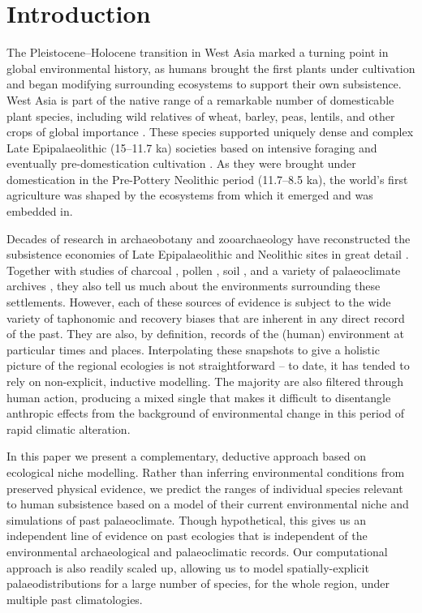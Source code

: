 \documentclass[
  authoryear,
  preprint]{elsarticle}
\begin{document}
\section{Introduction}\label{introduction}

The Pleistocene--Holocene transition in West Asia marked a turning point
in global environmental history, as humans brought the first plants
under cultivation and began modifying surrounding ecosystems to support
their own subsistence. West Asia is part of the native range of a
remarkable number of domesticable plant species, including wild
relatives of wheat, barley, peas, lentils, and other crops of global
importance \citep{cite}. These species supported uniquely dense and
complex Late Epipalaeolithic (15--11.7 ka) societies based on intensive
foraging \citep{cite} and eventually pre-domestication cultivation
\citep{cite}. As they were brought under domestication in the
Pre-Pottery Neolithic period (11.7--8.5 ka), the world's first
agriculture was shaped by the ecosystems from which it emerged and was
embedded in.

Decades of research in archaeobotany and zooarchaeology have
reconstructed the subsistence economies of Late Epipalaeolithic and
Neolithic sites in great detail \citep{cites}. Together with studies of
charcoal \citep{cite}, pollen \citep{cite}, soil \citep{cite}, and a
variety of palaeoclimate archives \citep{JonesEtAl2019}, they also tell
us much about the environments surrounding these settlements. However,
each of these sources of evidence is subject to the wide variety of
taphonomic and recovery biases that are inherent in any direct record of
the past. They are also, by definition, records of the (human)
environment at particular times and places. Interpolating these
snapshots to give a holistic picture of the regional ecologies is not
straightforward -- to date, it has tended to rely on non-explicit,
inductive modelling. The majority are also filtered through human
action, producing a mixed single that makes it difficult to disentangle
anthropic effects from the background of environmental change in this
period of rapid climatic alteration.

In this paper we present a complementary, deductive approach based on
ecological niche modelling. Rather than inferring environmental
conditions from preserved physical evidence, we predict the ranges of
individual species relevant to human subsistence based on a model of
their current environmental niche and simulations of past palaeoclimate.
Though hypothetical, this gives us an independent line of evidence on
past ecologies that is independent of the environmental archaeological
and palaeoclimatic records. Our computational approach is also readily
scaled up, allowing us to model spatially-explicit palaeodistributions
for a large number of species, for the whole region, under multiple past
climatologies.
\end{document}
